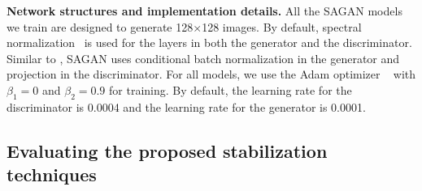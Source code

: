 \documentclass{article}
\begin{document}
\textbf{Network structures and implementation details. }
{
All the SAGAN models we train are designed to generate 128$\times$128 images. 
By default, spectral normalization~\cite{Miyato18a} is used for the layers in both the generator and the discriminator. Similar to \cite{Miyato18b}, SAGAN uses conditional batch normalization in the generator and projection in the discriminator. For all models, we use the Adam optimizer ~\cite{KingmaB14} with $\beta_1 = 0$ and $\beta_2 = 0.9$ for training.
By default, the learning rate for the discriminator is 0.0004 and the learning rate for the generator is 0.0001. 
}



\subsection{Evaluating the proposed stabilization techniques} \label{sec:sagan_stable}
\end{document}
